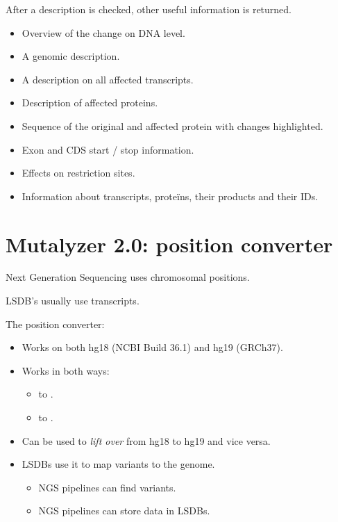 \documentclass[slidestop]{beamer}
\begin{document}
\begin{frame}
  After a description is checked, other useful information is returned.
  \begin{itemize}
    \pause
    \item Overview of the change on DNA level.
    \pause
    \item A genomic description.
    \pause
    \item A description on all affected transcripts.
    \pause
    \item Description of affected proteins.
    \pause
    \item Sequence of the original and affected protein with changes
      highlighted.
    \pause
    \item Exon and CDS start / stop information.
    \pause
    \item Effects on restriction sites.
    \pause
    \item Information about transcripts, prote\"ins, their products and their
      IDs.
  \end{itemize}
\end{frame}

\section{Mutalyzer 2.0: position converter}
\begin{frame}
  Next Generation Sequencing uses chromosomal positions.

  LSDB's usually use transcripts.
  \bigskip

  The position converter:
  \begin{itemize}
    \pause
    \item Works on both hg18 (NCBI Build 36.1) and hg19 (GRCh37).
    \pause
    \item Works in both ways:
    \begin{itemize}
      \item {} to
            .
      \item {} to
            .
    \end{itemize}
    \pause
    \item Can be used to \emph{lift over} from hg18 to hg19 and vice versa.
    \pause
    \item LSDBs use it to map variants to the genome.
    \begin{itemize}
      \item NGS pipelines can find variants.
      \item NGS pipelines can store data in LSDBs.
    \end{itemize}
  \end{itemize}
\end{frame}
\end{document}
